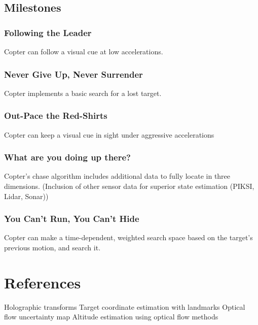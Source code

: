 \documentclass[11pt]{article}
\begin{document}
    \subsection{Milestones}

    \subsubsection{Following the Leader}
      Copter can follow a visual cue at low accelerations.

    \subsubsection{Never Give Up, Never Surrender}
      Copter implements a basic search for a lost target.

    \subsubsection{Out-Pace the Red-Shirts}
      Copter can keep a visual cue in sight under aggressive accelerations

    \subsubsection{What are you doing up there?}
      Copter's chase algorithm includes additional data to fully locate in three dimensions.
        (Inclusion of other sensor data for superior state estimation (PIKSI, Lidar, Sonar))

    \subsubsection{You Can't Run, You Can't Hide}
      Copter can make a time-dependent, weighted search space based on the target's previous motion, and search it.


  \section{References}
    Holographic transforms
    Target coordinate estimation with landmarks
    Optical flow uncertainty map
    Altitude estimation using optical flow methods











	
\end{document}
